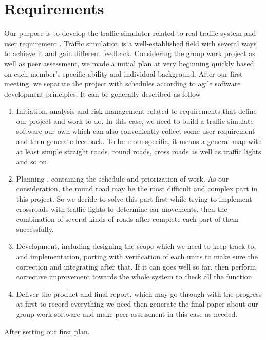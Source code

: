 \documentclass[11pt]{article}
\begin{document}
	\section{Requirements} %
	Our purpose is to develop the traffic simulator related to real traffic system and user requirement . Traffic simulation is a well-established field with several ways to achieve it and gain different feedback.           Considering the group work project as well as peer assessment, we made a initial plan at very beginning quickly based on each member’s specific ability and individual background. After our first meeting, we separate the project with schedules according to agile software development principles. It can be generally described as follow \\
	\begin{enumerate}[noitemsep]
\item Initiation, analysis and risk management related to requirements that define our project and work to do.  In this case, we need to build a traffic simulate software our own which can also conveniently collect some user requirement and then generate feedback. To be more specific, it means a general map with at least simple straight roads, round roads, cross roads as well as traffic lights and so on.\\
\item Planning , containing the schedule and priorization of work.
As our consideration, the round road may be the most difficult and complex part in this project. So we decide to solve this part first while trying to implement crossroads with traffic lights to determine car movements, then the combination of several kinds of roads after complete each part of them successfully. \\ 
\item Development, including designing the scope which we need to keep track to, and implementation, porting with verification of each units to make sure the correction and integrating after that. If it can goes well so far, then perform corrective improvement towards the whole system to check all the function.\\
\item Deliver the product and final report, which may go through with the progress at first to record everything we need then generate the final paper about our group work software and make peer assessment in this case as needed.
	\end{enumerate}
After setting our first plan.
\end{document}
